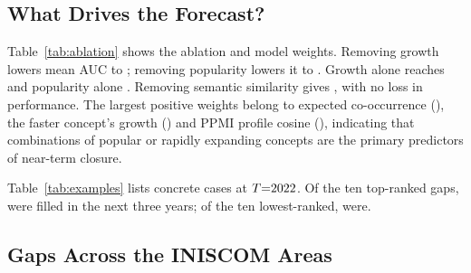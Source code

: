 \documentclass[runningheads]{llncs}
\begin{document}
\subsection{What Drives the Forecast?}

\begin{table}[t]
\centering
\caption{Left: drop-one and keep-only ablation of the learned forecaster (mean over the four test cutoffs). Right: standardised weights of the model trained for $T{=}2022$.}
\label{tab:ablation}
\scriptsize
\begin{minipage}{0.55\textwidth}\centering\end{minipage}%
\begin{minipage}{0.4\textwidth}\centering\end{minipage}
\end{table}

Table~\ref{tab:ablation} shows the ablation and model weights. Removing growth lowers mean AUC to \ablNoGrowth{}; removing popularity lowers it to \ablNoPop{}. Growth alone reaches \ablOnlyGrowth{} and popularity alone \ablOnlyPop{}. Removing semantic similarity gives \ablNoSem{}, with no loss in performance. The largest positive weights belong to expected co-occurrence (\coefExpected{}), the faster concept's growth (\coefGrowthMax{}) and PPMI profile cosine (\coefProfile{}), indicating that combinations of popular or rapidly expanding concepts are the primary predictors of near-term closure.

\begin{table}[t]
\centering
\caption{The ten highest- and lowest-ranked gaps at $T{=}\exT{}$ and later papers with detected joint mentions in 2023--2025 (closure needs $\ge3$).}
\label{tab:examples}
\scriptsize
\setlength{\tabcolsep}{3pt}
\resizebox{\textwidth}{!}{}
\end{table}

Table~\ref{tab:examples} lists concrete cases at $T{=}\exT{}$. Of the ten top-ranked gaps, \exTopFilled{} were filled in the next three years; of the ten lowest-ranked, \exBottomFilled{} were.

\subsection{Gaps Across the INISCOM Areas}

\begin{table}[t]
\centering
\caption{Three-year fill rate of gaps by the INISCOM areas of the two concepts, pooled over the four test cutoffs (number of gaps in brackets; cells with fewer than 20 gaps are greyed). The quantum area has a single concept, so it has no gaps within itself.}
\label{tab:areas}
\scriptsize
\setlength{\tabcolsep}{3pt}
\resizebox{\textwidth}{!}{}
\end{table}
\end{document}

